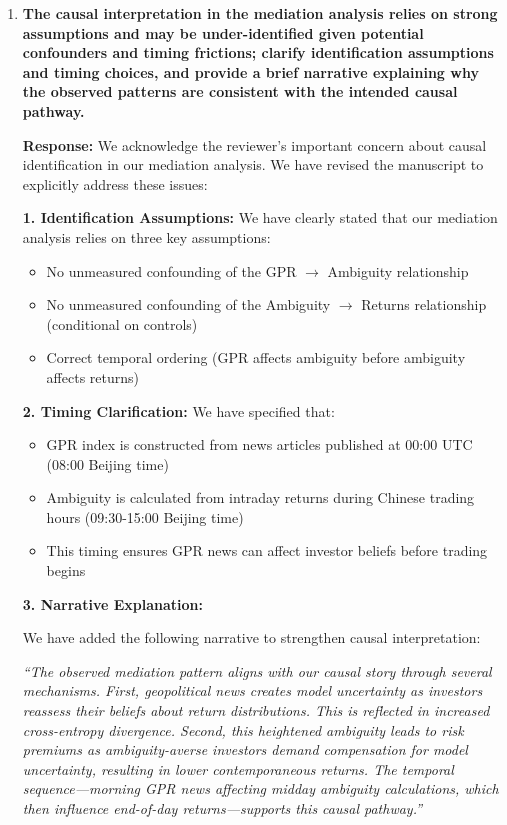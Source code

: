 \documentclass[12pt]{article}
\begin{document}
\begin{enumerate}
    \item \textbf{The causal interpretation in the mediation analysis relies on strong assumptions and may be under-identified given potential confounders and timing frictions; clarify identification assumptions and timing choices, and provide a brief narrative explaining why the observed patterns are consistent with the intended causal pathway.}

    \begin{responsebox}
    \vspace{0.5cm}
    \textbf{Response:} We acknowledge the reviewer's important concern about causal identification in our mediation analysis. We have revised the manuscript to explicitly address these issues:
    \vspace{0.5cm}

    \textbf{1. Identification Assumptions:}
    We have clearly stated that our mediation analysis relies on three key assumptions:
    \begin{itemize}
        \item No unmeasured confounding of the GPR $\rightarrow$ Ambiguity relationship
        \item No unmeasured confounding of the Ambiguity $\rightarrow$ Returns relationship (conditional on controls)
        \item Correct temporal ordering (GPR affects ambiguity before ambiguity affects returns)
    \end{itemize}

    \textbf{2. Timing Clarification:}
    We have specified that:
    \begin{itemize}
        \item GPR index is constructed from news articles published at 00:00 UTC (08:00 Beijing time)
        \item Ambiguity is calculated from intraday returns during Chinese trading hours (09:30-15:00 Beijing time)
        \item This timing ensures GPR news can affect investor beliefs before trading begins
    \end{itemize}


    \textbf{3. Narrative Explanation:}

    We have added the following narrative to strengthen causal interpretation:
    \vspace{0.5cm}

    \textit{``The observed mediation pattern aligns with our causal story through several mechanisms. First, geopolitical news creates model uncertainty as investors reassess their beliefs about return distributions. This is reflected in increased cross-entropy divergence. Second, this heightened ambiguity leads to risk premiums as ambiguity-averse investors demand compensation for model uncertainty, resulting in lower contemporaneous returns. The temporal sequence---morning GPR news affecting midday ambiguity calculations, which then influence end-of-day returns---supports this causal pathway.''}


\end{responsebox}
\end{enumerate}
\end{document}
